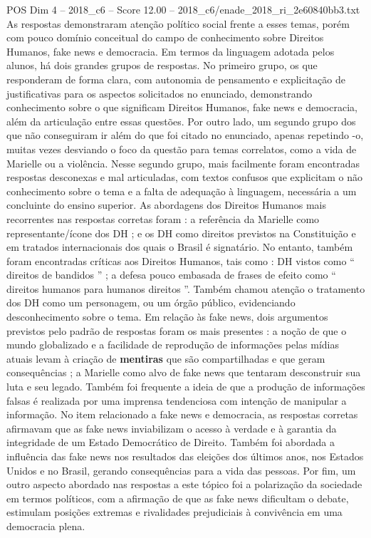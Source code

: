 \begin{textsample}{POS Dim 4 – 2018\_c6 – Score 12.00 – 2018\_c6/enade\_2018\_ri\_2e60840bb3.txt}
As respostas demonstraram atenção político social frente a esses temas, porém com pouco domínio conceitual do campo de conhecimento sobre Direitos Humanos, fake news e democracia.
Em termos da linguagem adotada pelos alunos, há dois grandes grupos de respostas.
No primeiro grupo, os que responderam de forma clara, com autonomia de pensamento e explicitação de justificativas para os aspectos solicitados no enunciado, demonstrando conhecimento sobre o que significam Direitos Humanos, fake news e democracia, além da articulação entre essas questões.
Por outro lado, um segundo grupo dos que não conseguiram ir além do que foi citado no enunciado, apenas repetindo -o, muitas vezes desviando o foco da questão para temas correlatos, como a vida de Marielle ou a violência.
Nesse segundo grupo, mais facilmente foram encontradas respostas desconexas e mal articuladas, com textos confusos que explicitam o não conhecimento sobre o tema e a falta de adequação à linguagem, necessária a um concluinte do ensino superior.
As abordagens dos Direitos Humanos mais recorrentes nas respostas corretas foram : a referência da Marielle como representante/ícone dos DH ; e os DH como direitos previstos na Constituição e em tratados internacionais dos quais o Brasil é signatário.
No entanto, também foram encontradas críticas aos Direitos Humanos, tais como : DH vistos como “ direitos de bandidos ” ; a defesa pouco embasada de frases de efeito como “ direitos humanos para humanos direitos ”.
Também chamou atenção o tratamento dos DH como um personagem, ou um órgão público, evidenciando desconhecimento sobre o tema.
Em relação às fake news, dois argumentos previstos pelo padrão de respostas foram os mais presentes : a noção de que o mundo globalizado e a facilidade de reprodução de informações pelas mídias atuais levam à criação de \textbf{mentiras} que são compartilhadas e que geram consequências ; a Marielle como alvo de fake news que tentaram desconstruir sua luta e seu legado.
Também foi frequente a ideia de que a produção de informações falsas é realizada por uma imprensa tendenciosa com intenção de manipular a informação.
No item relacionado a fake news e democracia, as respostas corretas afirmavam que as fake news inviabilizam o acesso à verdade e à garantia da integridade de um Estado Democrático de Direito.
Também foi abordada a influência das fake news nos resultados das eleições dos últimos anos, nos Estados Unidos e no Brasil, gerando consequências para a vida das pessoas.
Por fim, um outro aspecto abordado nas respostas a este tópico foi a polarização da sociedade em termos políticos, com a afirmação de que as fake news dificultam o debate, estimulam posições extremas e rivalidades prejudiciais à convivência em uma democracia plena.

\end{textsample}
